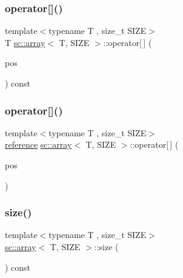 \mbox{\label{classsc_1_1array_a2d56c1df2b2490f60a974884fdbf8601}} 
\subsubsection{\texorpdfstring{operator[]()}{operator[]()}\hspace{0.1cm}{\footnotesize\ttfamily [1/2]}}
{\footnotesize\ttfamily template$<$typename T , size\+\_\+t S\+I\+ZE$>$ \\
T \hyperlink{classsc_1_1array}{sc\+::array}$<$ T, S\+I\+ZE $>$\+::operator\mbox{[}$\,$\mbox{]} (\begin{DoxyParamCaption}\item[{int}]{pos }\end{DoxyParamCaption}) const\hspace{0.3cm}{\ttfamily [inline]}}

\mbox{\label{classsc_1_1array_ae786a2893dd8f5290d6c4a3e1ac0cbcf}} 
\subsubsection{\texorpdfstring{operator[]()}{operator[]()}\hspace{0.1cm}{\footnotesize\ttfamily [2/2]}}
{\footnotesize\ttfamily template$<$typename T , size\+\_\+t S\+I\+ZE$>$ \\
\hyperlink{classsc_1_1array_ae7d6903e3e7b850083c836e5061ac785}{reference} \hyperlink{classsc_1_1array}{sc\+::array}$<$ T, S\+I\+ZE $>$\+::operator\mbox{[}$\,$\mbox{]} (\begin{DoxyParamCaption}\item[{\hyperlink{classsc_1_1array_a6358115a468f72263895bbb17c924718}{size\+\_\+type}}]{pos }\end{DoxyParamCaption})\hspace{0.3cm}{\ttfamily [inline]}}

\mbox{\label{classsc_1_1array_ac2a3102edfe1445b57a2004585ce8dcf}} 
\subsubsection{\texorpdfstring{size()}{size()}}
{\footnotesize\ttfamily template$<$typename T , size\+\_\+t S\+I\+ZE$>$ \\
\hyperlink{classsc_1_1array}{sc\+::array}$<$ T, S\+I\+ZE $>$\+::size (\begin{DoxyParamCaption}{ }\end{DoxyParamCaption}) const\hspace{0.3cm}{\ttfamily [inline]}}



